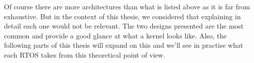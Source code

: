 Of course there are more architectures than what is listed above as it is far from exhaustive.
But in the context of this thesis, we considered that explaining in detail each one would not be relevant.
The two designs presented are the most common and provide a good glance at what a kernel looks like.
Also, the following parts of this thesis will expand on this
    and we'll see in practise what each RTOS takes from this theoretical point of view.
